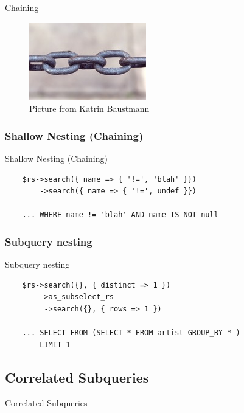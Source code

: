 \begin{frame}{Chaining}
  \begin{figure}[!ht]
    \begin{center}
      \includegraphics{img/chains.jpg}
      \caption[Chains]{Picture from Katrin Baustmann}
    \end{center}
  \end{figure}
\end{frame}


\subsubsection{Shallow Nesting (Chaining)}

\begin{frame}[fragile]{Shallow Nesting (Chaining)}
\begin{lstlisting}
    $rs->search({ name => { '!=', 'blah' }})
        ->search({ name => { '!=', undef }})

    ... WHERE name != 'blah' AND name IS NOT null
\end{lstlisting}
\end{frame}

\subsubsection{Subquery nesting}

\begin{frame}[fragile]{Subquery nesting}
\begin{lstlisting}
    $rs->search({}, { distinct => 1 })
        ->as_subselect_rs
         ->search({}, { rows => 1 })

    ... SELECT FROM (SELECT * FROM artist GROUP_BY * )
        LIMIT 1
\end{lstlisting}
\end{frame}

\subsection{Correlated Subqueries}
\begin{frame}{Correlated Subqueries}
\end{frame}


